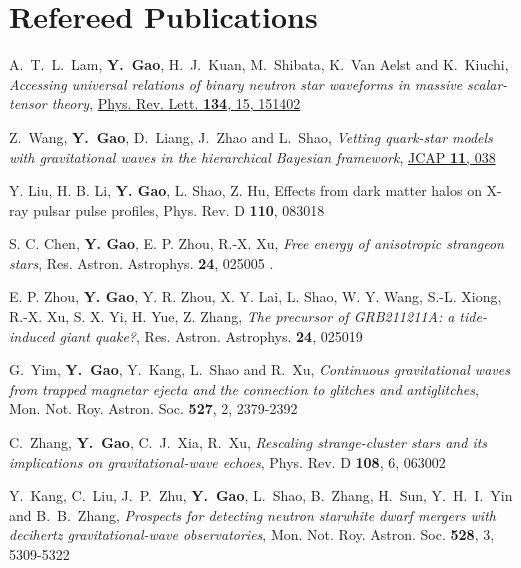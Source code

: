 \section{\sc Refereed Publications}
\begin{etaremune}
  \item 
  A.~T.~L.~Lam, {\bf Y.~Gao}, H.~J.~Kuan, M.~Shibata, K.~Van Aelst and K.~Kiuchi,
  {\it Accessing universal relations of binary neutron star waveforms in massive scalar-tensor theory},
  \href{https://journals.aps.org/prl/abstract/10.1103/PhysRevLett.134.151402}{Phys. Rev. Lett. {\bf 134}, 15, 151402}
  \item 
  Z.~Wang, {\bf Y.~Gao}, D.~Liang, J.~Zhao and L.~Shao,
  {\it Vetting quark-star models with gravitational waves in the hierarchical Bayesian framework},
  \href{https://iopscience.iop.org/article/10.1088/1475-7516/2024/11/038}{JCAP {\bf 11}, 038}
  \item 
  Y. Liu, H. B. Li, {\bf Y. Gao}, L. Shao, Z. Hu, Effects from dark matter halos on X-ray pulsar pulse profiles, Phys. Rev. D {\bf 110}, 083018 
  \item 
  S. C. Chen, {\bf Y. Gao}, E. P. Zhou, R.-X. Xu, {\it Free energy of anisotropic strangeon stars}, Res. Astron. Astrophys. {\bf 24}, 025005 .
  \item 
  E. P. Zhou, 
  {\bf Y. Gao}, 
  Y. R. Zhou, 
  X. Y. Lai, L. Shao, W. Y. Wang, S.-L. Xiong, R.-X. Xu, S. X. Yi, H. Yue, Z. Zhang, 
  {\it The precursor of GRB211211A: a tide-induced giant quake?}, Res. Astron. Astrophys. {\bf 24}, 025019
  \item 
  G.~Yim, {\bf Y.~Gao}, Y.~Kang, L.~Shao and R.~Xu,
  {\it Continuous gravitational waves from trapped magnetar ejecta and the connection to glitches and antiglitches},
  Mon. Not. Roy. Astron. Soc. {\bf 527}, 2, 2379-2392 
  \item 
  C.~Zhang, 
  {\bf Y.~Gao}, 
  C.~J.~Xia,
  R.~Xu,
  {\it Rescaling strange-cluster stars and its implications on gravitational-wave echoes},
  Phys. Rev. D {\bf 108}, 6, 063002
  \item 
  Y.~Kang, C.~Liu, J.~P.~Zhu, {\bf Y.~Gao}, L.~Shao, B.~Zhang, H.~Sun, Y.~H.~I.~Yin and B.~B.~Zhang,
  {\it Prospects for detecting neutron star\textendash{}white dwarf mergers with decihertz gravitational-wave observatories},
  Mon. Not. Roy. Astron. Soc. {\bf 528}, 3, 5309-5322
  \item 

\end{etaremune}
